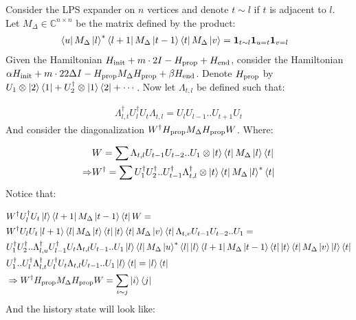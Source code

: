 \documentclass[manuscript,screen,review]{acmart}
\begin{document}
Consider the LPS expander on $n$ vertices and denote $t \sim l$ if $t$ is adjacent to $l$. Let $M_\Delta \in \mathbb{C}^{n \times n}$ be the matrix defined by the product:  
\begin{equation*}
  \begin{split}
    &\bra{u}M_{\Delta}\ket{l}^{*}\bra{l+1}M_{\Delta}\ket{t-1} \bra{t} M_{\Delta}\ket{v} = \mathbf{1}_{ t \sim l } \mathbf{1}_{u = t} \mathbf{1}_{v = l } 
  \end{split}
\end{equation*}
Given the Hamiltonian $H_{\text{init}} + m \cdot 2I - H_{\text{prop}} + H_{\text{end}}$, consider the Hamiltonian $\alpha H_{\text{init}} + m \cdot 22\Delta I - H_{\text{prop}} M_\Delta H_{\text{prop}} + \beta H_{\text{end}}$. Denote $H_{\text{prop}}$ by $U_{1} \otimes \ket{2}\bra{1}  + U_{2}^{\dagger} \otimes \ket{1}\bra{2} + \cdots $.
Now let $\Lambda_{t,l}$ be defined such that:
 
 \begin{equation*}
   \begin{split}
     \Lambda^{\dagger}_{l,t} U_{l}^{\dagger}U_{t} \Lambda_{t,l} = U_{l}U_{l-1}..U_{t+1}U_{t}
   \end{split}
 \end{equation*}
And consider the diagonalization $W^{\dagger}H_{\text{prop}} M_{\Delta} H_{\text{prop}} W$. Where:

\begin{equation*}
  \begin{split}
    & W = \sum\Lambda_{t,l}U_{t-1}U_{t-2}..U_{1} \otimes \ket{t}\bra{t} M_{\Delta}\ket{l}\bra{t} \\ 
    \Rightarrow & W^{\dagger} = \sum U_{1}^{\dagger}U_{2}^{\dagger} .. U_{t-1}^{\dagger} \Lambda_{t,l}^{\dagger} \otimes \ket{t}\bra{t} M_{\Delta}\ket{l}^{*}\bra{t} 
  \end{split}
\end{equation*}
Notice that: 

\begin{equation*}
  \begin{split}
    & W^{\dagger}U_{l}^{\dagger}U_{t}\ket{l}\bra{l+1}M_{\Delta}\ket{t-1}\bra{t}W = \\
    & W^{\dagger}U_{l}U_{t}\ket{l+1}\bra{l}M_{\Delta}\ket{t}\bra{t}\ket{t}\bra{t}M_{\Delta}\ket{v}\bra{t}\Lambda_{t,v}U_{t-1}U_{t-2}..U_{1} = \\
    & U_{1}^{\dagger}U_{2}^{\dagger}.. \Lambda_{l,u}^{\dagger}  U_{l-1}^{\dagger}U_{t}\Lambda_{t,l}U_{t-1}.. U_{1} \ket{l}\bra{l}M_{\Delta}\ket{u}^{*}\bra{l}\ket{l}\bra{l+1} M_{\Delta}\ket{t-1} \bra{t}\ket{t}\bra{t} M_{\Delta}\ket{v} \ket{l}\bra{t} \\
    & U_{1}^{\dagger} .. U_{l}^{\dagger} \Lambda^{\dagger}_{l,t} U_{l}^{\dagger}U_{t} \Lambda_{t,l} U_{t-1} .. U_{1} \ket{l}\bra{t} = \ket{l}\bra{t} \\ 
    &\Rightarrow  W^{\dagger}H_{\text{prop}} M_{\Delta} H_{\text{prop}} W = \sum_{i\sim j}\ket{i}\bra{j}
  \end{split}
\end{equation*}
And the history state will look like:
\end{document}
